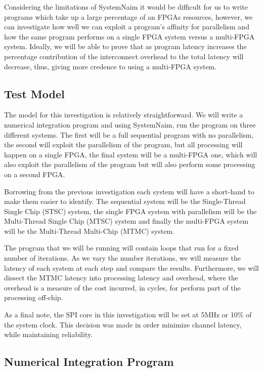 Considering the limitations of SystemNaim it would be difficult for us to write programs which take up a large percentage of an FPGAs resources, however, we can investigate how well we can exploit a program's affinity for parallelism and how the same program performs on a single FPGA system versus a multi-FPGA system. Ideally, we will be able to prove that as program latency increases the percentage contribution of the interconnect overhead to the total latency will decrease, thus, giving more credence to using a multi-FPGA system.

\subsection{Test Model}

The model for this investigation is relatively straightforward. We will write a numerical integration program and using SystemNaim, run the program on three different systems. The first will be a full sequential program with no parallelism, the second will exploit the parallelism of the program, but all processing will happen on a single FPGA, the final system will be a multi-FPGA one, which will also exploit the parallelism of the program but will also perform some processing on a second FPGA.

Borrowing from the previous investigation each system will have a short-hand to make them easier to identify. The sequential system will be the Single-Thread Single Chip (STSC) system, the single FPGA system with parallelism will be the Multi-Thread Single Chip (MTSC) system and finally the multi-FPGA system will be the Multi-Thread Multi-Chip (MTMC) system.

The program that we will be running will contain loops that run for a fixed number of iterations. As we vary the number iterations, we will measure the latency of each system at each step and compare the results. Furthermore, we will dissect the MTMC latency into processing latency and overhead, where the overhead is a measure of the cost incurred, in cycles, for perform part of the processing off-chip.

As a final note, the SPI core in this investigation will be set at 5MHz or 10\% of the system clock. This decision was made in order minimize channel latency, while maintaining reliability.

\subsection{Numerical Integration Program}

